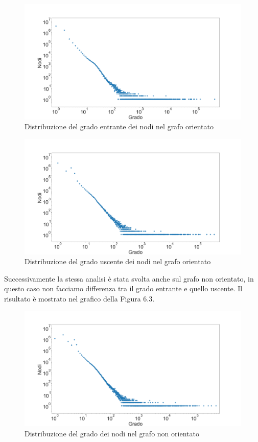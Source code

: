 \documentclass[12pt]{report}
\begin{document}
\begin{figure}[H]
    \centering\includegraphics[width=\textwidth]{DirINDegreeDistribution.png}
        \caption{Distribuzione del grado entrante dei nodi nel grafo orientato}
\end{figure}
\begin{figure}[H]
        \centering\includegraphics[width=\textwidth]{DirOUTDegreeDistribution.png}
        \caption{Distribuzione del grado uscente dei nodi nel grafo orientato}
\end{figure}
\newpage
Successivamente la stessa analisi è stata svolta anche sul grafo non orientato, in questo caso non facciamo differenza tra il grado entrante e quello uscente. Il risultato è mostrato nel grafico della Figura 6.3.

\begin{figure}[H]
    \includegraphics[width=\textwidth]{UndirDegreeDistribution.png}
    \caption{Distribuzione del grado dei nodi nel grafo non orientato}
\end{figure}
\end{document}

